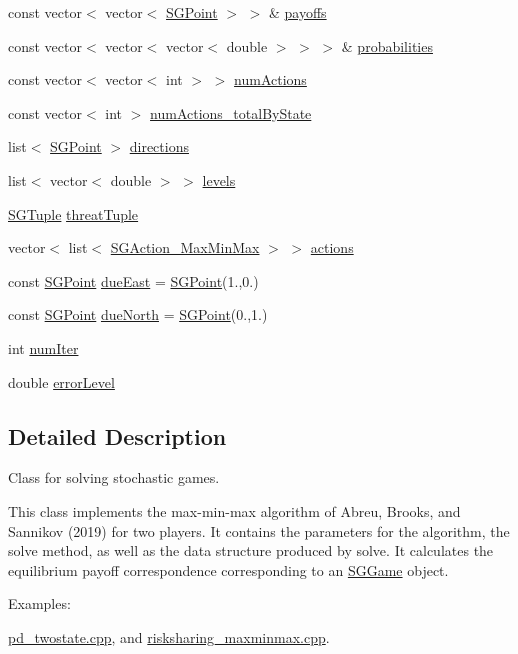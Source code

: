 \begin{DoxyCompactItemize}
const vector$<$ vector$<$ \hyperlink{classSGPoint}{S\+G\+Point} $>$ $>$ \& \hyperlink{classSGSolver__MaxMinMax_a0f462247c1e77dc832f148e6c1e6869a}{payoffs}
\item 
const vector$<$ vector$<$ vector$<$ double $>$ $>$ $>$ \& \hyperlink{classSGSolver__MaxMinMax_a7e0fe7fcc94931357a327bbb3efc6e85}{probabilities}
\item 
const vector$<$ vector$<$ int $>$ $>$ \hyperlink{classSGSolver__MaxMinMax_a58be6ea5885884e3dda5cdfcaf92236c}{num\+Actions}
\item 
const vector$<$ int $>$ \hyperlink{classSGSolver__MaxMinMax_a17e30f869dd8132126a07b31a5123ad5}{num\+Actions\+\_\+total\+By\+State}
\item 
list$<$ \hyperlink{classSGPoint}{S\+G\+Point} $>$ \hyperlink{classSGSolver__MaxMinMax_a8ec4678b23922c70408b49b571c1bd19}{directions}
\item 
list$<$ vector$<$ double $>$ $>$ \hyperlink{classSGSolver__MaxMinMax_a460070c82cf475efbe9925a04b3266ca}{levels}
\item 
\hyperlink{classSGTuple}{S\+G\+Tuple} \hyperlink{classSGSolver__MaxMinMax_a462ec472762a3b65b52d2b0973936e64}{threat\+Tuple}
\item 
vector$<$ list$<$ \hyperlink{classSGAction__MaxMinMax}{S\+G\+Action\+\_\+\+Max\+Min\+Max} $>$ $>$ \hyperlink{classSGSolver__MaxMinMax_ad1a4bf22aaa58dd05c7bc7a24d9c1805}{actions}
\item 
const \hyperlink{classSGPoint}{S\+G\+Point} \hyperlink{classSGSolver__MaxMinMax_a60d94f1084517a2e521328f18aa17608}{due\+East} = \hyperlink{classSGPoint}{S\+G\+Point}(1.,0.)
\item 
const \hyperlink{classSGPoint}{S\+G\+Point} \hyperlink{classSGSolver__MaxMinMax_a147a1c72b0b6b4c07412141441ac433d}{due\+North} = \hyperlink{classSGPoint}{S\+G\+Point}(0.,1.)
\item 
int \hyperlink{classSGSolver__MaxMinMax_aa9e508ac0cf0175d2635a2fcc4bb207a}{num\+Iter}
\item 
double \hyperlink{classSGSolver__MaxMinMax_a9dd42927e8a20c84a19b6019d93146e1}{error\+Level}
\end{DoxyCompactItemize}


\subsection{Detailed Description}
Class for solving stochastic games. 

This class implements the max-\/min-\/max algorithm of Abreu, Brooks, and Sannikov (2019) for two players. It contains the parameters for the algorithm, the solve method, as well as the data structure produced by solve. It calculates the equilibrium payoff correspondence corresponding to an \hyperlink{classSGGame}{S\+G\+Game} object. \begin{Desc}
\item[Examples\+: ]\par
\hyperlink{pd_twostate_8cpp-example}{pd\+\_\+twostate.\+cpp}, and \hyperlink{risksharing_maxminmax_8cpp-example}{risksharing\+\_\+maxminmax.\+cpp}.\end{Desc}


